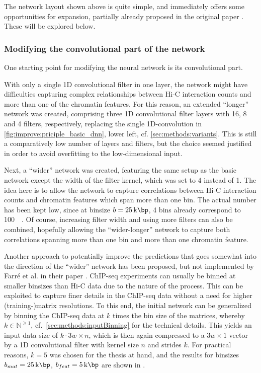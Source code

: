 The network layout shown above is quite simple, and immediately offers some opportunities
for expansion, partially already proposed in the original paper \cite{Farre2018a}.
These will be explored below.

\subsubsection{Modifying the convolutional part of the network}
One starting point for modifying the neural network is its convolutional part.

With only a single 1D convolutional filter in one layer, the network might have difficulties capturing complex relationships 
between Hi-C interaction counts and more than one of the chromatin features.
For this reason, an extended ``longer'' network was created, 
comprising three 1D convolutional filter layers with 16, 8 and 4 filters, respectively, replacing the single
1D-convolution in \cref{fig:improve:priciple_basic_dnn}, lower left, cf. \cref{sec:methods:variants}.
This is still a comparatively low number of layers and filters,
but the choice seemed justified in order to avoid overfitting to the low-dimensional input.

Next, a ``wider'' network was created, featuring the same setup as the basic network
except the width of the filter kernel, which was set to 4 instead of 1.
The idea here is to allow the network to capture correlations between Hi-C interaction counts
and chromatin features which span more than one bin. 
The actual number has been kept low, since at binsize $b=\SI{25}{\kilo\bp}$, 4 bins already correspond to \SI{100}{\kilo\bp}.
Of course, increasing filter width and using more filters can also be combined,
hopefully allowing the  ``wider-longer'' network to capture both correlations
spanning more than one bin and more than one chromatin feature.

Another approach to potentially improve the predictions that goes somewhat into
the direction of the ``wider'' network has been proposed, but not implemented by Farr\'e et al. 
in their paper \cite{Farre2018a}.
ChIP-seq experiments can usually be binned at smaller binsizes than Hi-C data due to the nature of 
the process. 
This can be exploited to capture finer details in the ChIP-seq data without a need for higher (training-)matrix resolutions.
To this end, the initial network can be generalized by binning the ChIP-seq data at $k$ times the bin size of the matrices, 
whereby $k \in \mathbb{N}^{\geq1}$, cf.~\cref{sec:methods:inputBinning} for the technical details.
This yields an input data size of $k \cdot 3w \times n$, which is then again compressed to a $3w \times 1$ vector 
by a 1D convolutional filter with kernel size $n$ and strides $k$. 
For practical reasons, $k=5$ was chosen for the thesis at hand, 
and the results for binsizes $b_{mat}=\SI{25}{\kilo\bp}$, $b_{feat}=\SI{5}{\kilo\bp}$ are shown in \xxx.


